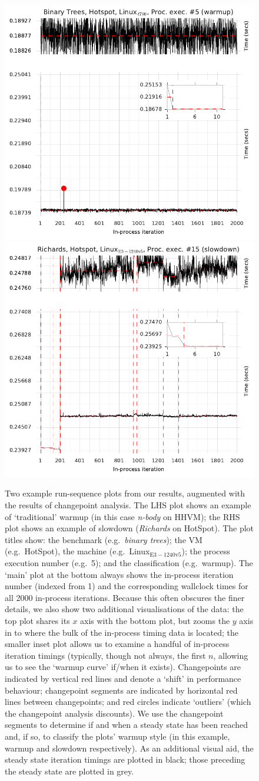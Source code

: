 \documentclass[acmlarge]{acmart}\settopmatter{printfolios=true}
\newcommand{\binarytrees}{\emph{binary trees}\xspace}
\newcommand{\richards}{\emph{Richards}\xspace}
\newcommand{\nbody}{\emph{n-body}\xspace}
\newcommand{\bencherseven}{Linux$_\mathrm{E3-1240v5}$\xspace}
\begin{document}
\begin{figure}[t]
\centering
\includegraphics[width=.49\textwidth]{examples/new_warmup_no_migrate.pdf}
\hspace{\fill}
\includegraphics[width=.49\textwidth]{examples/changepoint_example.pdf}
\caption{Two example run-sequence plots from our results, augmented
with the results of changepoint analysis. The LHS plot
shows an example of `traditional' warmup (in this case \nbody on HHVM);
the RHS plot shows an example of slowdown (\richards on HotSpot). The
plot titles show: the benchmark (e.g.~\binarytrees); the VM (e.g.~HotSpot),
the machine (e.g.~\bencherseven); the process execution number (e.g.~5);
and the classification (e.g.~warmup). The `main' plot at the bottom always shows
the in-process iteration number (indexed from 1) and the corresponding wallclock
times for all 2000 in-process iterations. Because this often obscures the finer
details, we also show two additional visualisations of the data: the top plot
shares its $x$ axis with the bottom plot, but zooms the $y$ axis in to where the bulk of the
in-process timing data is located; the smaller inset plot allows us to examine a handful
of in-process iteration timings (typically, though not always, the first $n$,
allowing us to see the `warmup curve' if/when it exists). Changepoints
are indicated by vertical red lines and denote a `shift' in performance behaviour;
changepoint segments are indicated by horizontal red lines between changepoints; and red circles indicate `outliers'
(which the changepoint analysis discounts). We use the changepoint
segments to determine if and when a steady state has been reached and,
if so, to classify the plots' warmup style (in this example, warmup and
slowdown respectively). As an additional visual aid, the steady state iteration
timings are plotted in black; those preceding the steady state are plotted in grey.
}
\label{fig:changepoint}
\end{figure}
\end{document}

